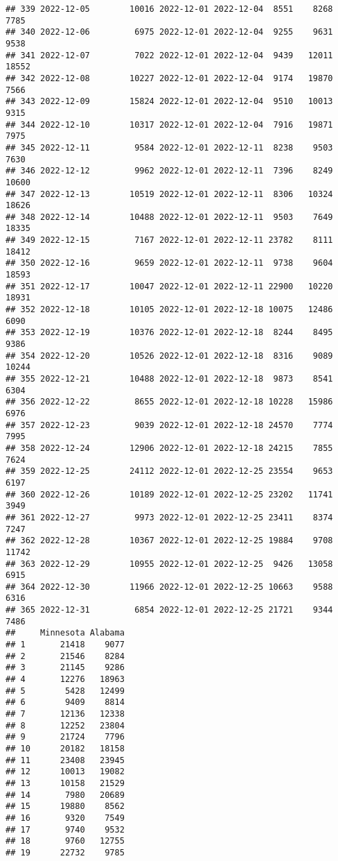 \documentclass[
]{article}
\begin{document}
\begin{verbatim}
## 339 2022-12-05        10016 2022-12-01 2022-12-04  8551    8268       7785
## 340 2022-12-06         6975 2022-12-01 2022-12-04  9255    9631       9538
## 341 2022-12-07         7022 2022-12-01 2022-12-04  9439   12011      18552
## 342 2022-12-08        10227 2022-12-01 2022-12-04  9174   19870       7566
## 343 2022-12-09        15824 2022-12-01 2022-12-04  9510   10013       9315
## 344 2022-12-10        10317 2022-12-01 2022-12-04  7916   19871       7975
## 345 2022-12-11         9584 2022-12-01 2022-12-11  8238    9503       7630
## 346 2022-12-12         9962 2022-12-01 2022-12-11  7396    8249      10600
## 347 2022-12-13        10519 2022-12-01 2022-12-11  8306   10324      18626
## 348 2022-12-14        10488 2022-12-01 2022-12-11  9503    7649      18335
## 349 2022-12-15         7167 2022-12-01 2022-12-11 23782    8111      18412
## 350 2022-12-16         9659 2022-12-01 2022-12-11  9738    9604      18593
## 351 2022-12-17        10047 2022-12-01 2022-12-11 22900   10220      18931
## 352 2022-12-18        10105 2022-12-01 2022-12-18 10075   12486       6090
## 353 2022-12-19        10376 2022-12-01 2022-12-18  8244    8495       9386
## 354 2022-12-20        10526 2022-12-01 2022-12-18  8316    9089      10244
## 355 2022-12-21        10488 2022-12-01 2022-12-18  9873    8541       6304
## 356 2022-12-22         8655 2022-12-01 2022-12-18 10228   15986       6976
## 357 2022-12-23         9039 2022-12-01 2022-12-18 24570    7774       7995
## 358 2022-12-24        12906 2022-12-01 2022-12-18 24215    7855       7624
## 359 2022-12-25        24112 2022-12-01 2022-12-25 23554    9653       6197
## 360 2022-12-26        10189 2022-12-01 2022-12-25 23202   11741       3949
## 361 2022-12-27         9973 2022-12-01 2022-12-25 23411    8374       7247
## 362 2022-12-28        10367 2022-12-01 2022-12-25 19884    9708      11742
## 363 2022-12-29        10955 2022-12-01 2022-12-25  9426   13058       6915
## 364 2022-12-30        11966 2022-12-01 2022-12-25 10663    9588       6316
## 365 2022-12-31         6854 2022-12-01 2022-12-25 21721    9344       7486
##     Minnesota Alabama
## 1       21418    9077
## 2       21546    8284
## 3       21145    9286
## 4       12276   18963
## 5        5428   12499
## 6        9409    8814
## 7       12136   12338
## 8       12252   23804
## 9       21724    7796
## 10      20182   18158
## 11      23408   23945
## 12      10013   19082
## 13      10158   21529
## 14       7980   20689
## 15      19880    8562
## 16       9320    7549
## 17       9740    9532
## 18       9760   12755
## 19      22732    9785

\end{verbatim}
\end{document}
